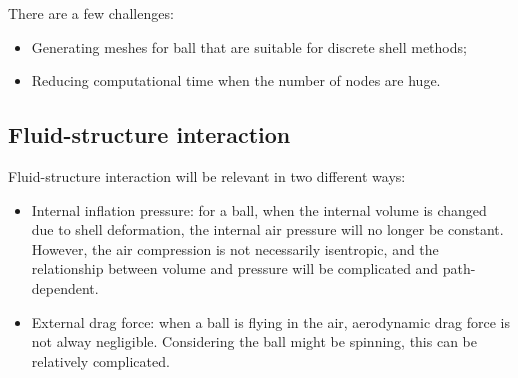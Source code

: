 \documentclass[letterpaper,9pt]{article}
\begin{document}
\begin{multicols}{2}
			There are a few challenges:
			\begin{itemize}
				\item Generating meshes for ball that are suitable for discrete shell methods;
				\item Reducing computational time when the number of nodes are huge.
			\end{itemize}
		\subsection{Fluid-structure interaction}
			Fluid-structure interaction will be relevant in two different ways:
			\begin{itemize}
				\item Internal inflation pressure: for a ball, when the internal volume is changed due to shell deformation, the internal air pressure will no longer be constant. However, the air compression is not necessarily isentropic, and the relationship between volume and pressure will be complicated and path-dependent.
				\item External drag force: when a ball is flying in the air, aerodynamic drag force is not alway negligible. Considering the ball might be spinning, this can be relatively complicated.
			\end{itemize}		
	
\end{multicols}
\end{document}
